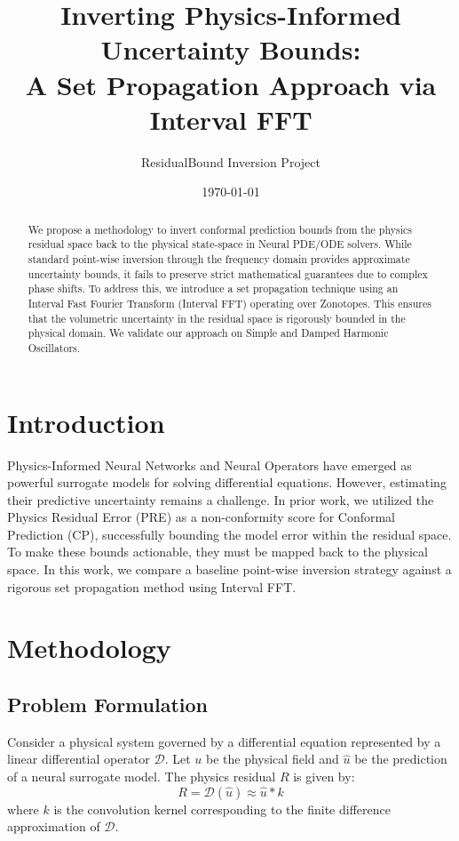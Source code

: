 \documentclass{article}
\title{Inverting Physics-Informed Uncertainty Bounds:\\A Set Propagation Approach via Interval FFT}
\author{ResidualBound Inversion Project}
\date{\today}
\begin{document}
\maketitle

\begin{abstract}
We propose a methodology to invert conformal prediction bounds from the physics residual space back to the physical state-space in Neural PDE/ODE solvers. While standard point-wise inversion through the frequency domain provides approximate uncertainty bounds, it fails to preserve strict mathematical guarantees due to complex phase shifts. To address this, we introduce a set propagation technique using an Interval Fast Fourier Transform (Interval FFT) operating over Zonotopes. This ensures that the volumetric uncertainty in the residual space is rigorously bounded in the physical domain. We validate our approach on Simple and Damped Harmonic Oscillators.
\end{abstract}

\section{Introduction}
Physics-Informed Neural Networks and Neural Operators have emerged as powerful surrogate models for solving differential equations. However, estimating their predictive uncertainty remains a challenge. In prior work, we utilized the Physics Residual Error (PRE) as a non-conformity score for Conformal Prediction (CP), successfully bounding the model error within the residual space. To make these bounds actionable, they must be mapped back to the physical space. In this work, we compare a baseline point-wise inversion strategy against a rigorous set propagation method using Interval FFT.

\section{Methodology}

\subsection{Problem Formulation}
Consider a physical system governed by a differential equation represented by a linear differential operator $\mathcal{D}$. Let $u$ be the physical field and $\hat{u}$ be the prediction of a neural surrogate model. The physics residual $R$ is given by:
\begin{equation}
    R = \mathcal{D}(\hat{u}) \approx \hat{u} * k
\end{equation}
where $k$ is the convolution kernel corresponding to the finite difference approximation of $\mathcal{D}$. 
\end{document}

